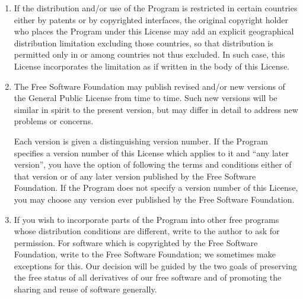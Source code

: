 \documentclass[a4paper,11pt,oneside]{book}
\begin{document}
\begin{enumerate}
	It is not the purpose of this section to induce you to infringe any
	patents or other property right claims or to contest validity of any
	such claims; this section has the sole purpose of protecting the
	integrity of the free software distribution system, which is
	implemented by public license practices.  Many people have made
	generous contributions to the wide range of software distributed
	through that system in reliance on consistent application of that
	system; it is up to the author/donor to decide if he or she is willing
	to distribute software through any other system and a licensee cannot
	impose that choice.

	This section is intended to make thoroughly clear what is believed to
	be a consequence of the rest of this License.

	\item
	If the distribution and/or use of the Program is restricted in
	certain countries either by patents or by copyrighted interfaces, the
	original copyright holder who places the Program under this License
	may add an explicit geographical distribution limitation excluding
	those countries, so that distribution is permitted only in or among
	countries not thus excluded.  In such case, this License incorporates
	the limitation as if written in the body of this License.

	\item
	The Free Software Foundation may publish revised and/or new versions
	of the General Public License from time to time.  Such new versions will
	be similar in spirit to the present version, but may differ in detail to
	address new problems or concerns.

	Each version is given a distinguishing version number.  If the Program
	specifies a version number of this License which applies to it and ``any
	later version'', you have the option of following the terms and conditions
	either of that version or of any later version published by the Free
	Software Foundation.  If the Program does not specify a version number of
	this License, you may choose any version ever published by the Free Software
	Foundation.

	\item
	If you wish to incorporate parts of the Program into other free
	programs whose distribution conditions are different, write to the author
	to ask for permission.  For software which is copyrighted by the Free
	Software Foundation, write to the Free Software Foundation; we sometimes
	make exceptions for this.  Our decision will be guided by the two goals
	of preserving the free status of all derivatives of our free software and
	of promoting the sharing and reuse of software generally.


\end{enumerate}
\end{document}
